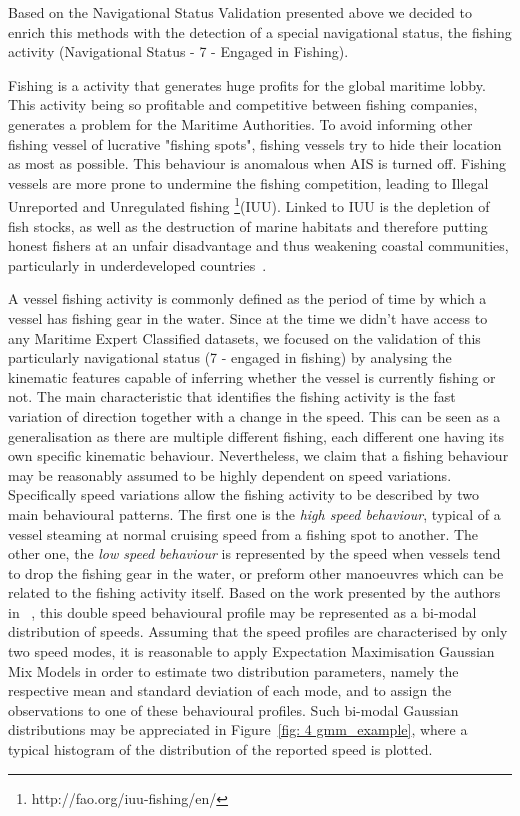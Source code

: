 Based on the Navigational Status Validation presented above we decided to enrich this methods with the detection of a special navigational status, the fishing activity (Navigational Status - 7 - Engaged in Fishing). 

Fishing is a activity that generates huge profits for the global maritime lobby. This activity being so profitable and competitive between fishing companies, generates a problem for the Maritime Authorities. To avoid informing other fishing vessel of lucrative "fishing spots", fishing vessels try to hide their location as most as possible. This behaviour is anomalous when AIS is turned off. Fishing vessels are more prone to undermine the fishing competition, leading to Illegal Unreported and Unregulated fishing \footnote{http://fao.org/iuu-fishing/en/}(IUU).  Linked to IUU is the depletion of fish stocks, as well as the destruction of marine habitats and therefore putting honest fishers at an unfair disadvantage and thus weakening coastal communities, particularly in underdeveloped countries~\cite{kroodsma2018TrackingFisheries}.

A vessel fishing activity is commonly defined as the period of time by which a vessel has fishing gear in the water. Since at the time we didn't have access to any Maritime Expert Classified datasets, we focused on the validation of this particularly navigational status (7 - engaged in fishing) by analysing the kinematic features capable of inferring whether the vessel is currently fishing or not. 
The main characteristic that identifies the fishing activity is the fast variation of direction together with a change in the speed. This can be seen as a generalisation as there are multiple different fishing, each different one having its own specific kinematic behaviour.
Nevertheless, we claim that a fishing behaviour may be reasonably assumed to be highly dependent on speed variations. Specifically speed variations allow the fishing activity to be described by two main behavioural patterns. The first one is the \emph{high speed behaviour}, typical of a vessel steaming at normal cruising speed from a fishing spot to another. The other one, the \emph{low speed behaviour} is represented by the speed when vessels tend to drop the fishing gear in the water, or preform other manoeuvres which can be related to the fishing activity itself. Based on the work presented by the authors in ~\cite{DeSouza2016ImprovingLearning, Natale2015MappingData, Mazzarella2014DiscoveringFootprints}, this double speed behavioural profile may be represented as a bi-modal distribution of speeds. Assuming that the speed profiles are characterised by only two speed modes, it is reasonable to apply Expectation Maximisation Gaussian Mix Models in order to estimate two distribution parameters, namely the respective mean and standard deviation of each mode, and to assign the observations to one of these behavioural profiles.
Such bi-modal Gaussian distributions may be appreciated in Figure~\ref{fig: 4 gmm_example}, where a typical histogram of the distribution of the reported speed is plotted.


